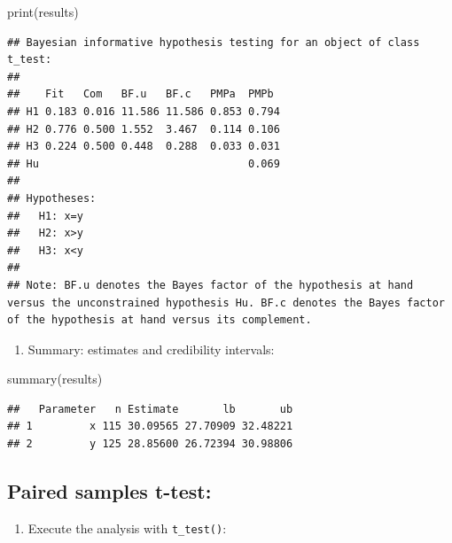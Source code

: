 \documentclass[
]{book}
\newenvironment{Shaded}{\begin{snugshade}}{\end{snugshade}}
\newcommand{\AttributeTok}[1]{\textcolor[rgb]{0.77,0.63,0.00}{#1}}
\newcommand{\CommentTok}[1]{\textcolor[rgb]{0.56,0.35,0.01}{\textit{#1}}}
\newcommand{\ConstantTok}[1]{\textcolor[rgb]{0.00,0.00,0.00}{#1}}
\newcommand{\FunctionTok}[1]{\textcolor[rgb]{0.00,0.00,0.00}{#1}}
\newcommand{\NormalTok}[1]{#1}
\newcommand{\OtherTok}[1]{\textcolor[rgb]{0.56,0.35,0.01}{#1}}
\newcommand{\SpecialCharTok}[1]{\textcolor[rgb]{0.00,0.00,0.00}{#1}}
\providecommand{\tightlist}{%
  \setlength{\itemsep}{0pt}\setlength{\parskip}{0pt}}
\begin{document}
\begin{Shaded}
\begin{Highlighting}[]
\FunctionTok{print}\NormalTok{(results)}
\end{Highlighting}
\end{Shaded}

\begin{verbatim}
## Bayesian informative hypothesis testing for an object of class t_test:
## 
##    Fit   Com   BF.u   BF.c   PMPa  PMPb 
## H1 0.183 0.016 11.586 11.586 0.853 0.794
## H2 0.776 0.500 1.552  3.467  0.114 0.106
## H3 0.224 0.500 0.448  0.288  0.033 0.031
## Hu                                 0.069
## 
## Hypotheses:
##   H1: x=y
##   H2: x>y
##   H3: x<y
## 
## Note: BF.u denotes the Bayes factor of the hypothesis at hand versus the unconstrained hypothesis Hu. BF.c denotes the Bayes factor of the hypothesis at hand versus its complement.
\end{verbatim}

\begin{enumerate}
\def\labelenumi{\arabic{enumi})}
\setcounter{enumi}{3}
\tightlist
\item
  Summary: estimates and credibility intervals:
\end{enumerate}

\begin{Shaded}
\begin{Highlighting}[]
\FunctionTok{summary}\NormalTok{(results)}
\end{Highlighting}
\end{Shaded}

\begin{verbatim}
##   Parameter   n Estimate       lb       ub
## 1         x 115 30.09565 27.70909 32.48221
## 2         y 125 28.85600 26.72394 30.98806
\end{verbatim}

\hypertarget{paired-samples-t-test}{%
\subsection{Paired samples t-test:}\label{paired-samples-t-test}}

\begin{enumerate}
\def\labelenumi{\arabic{enumi})}
\tightlist
\item
  Execute the analysis with \texttt{t\_test()}:
\end{enumerate}

\begin{Shaded}
\end{Shaded}
\end{document}
